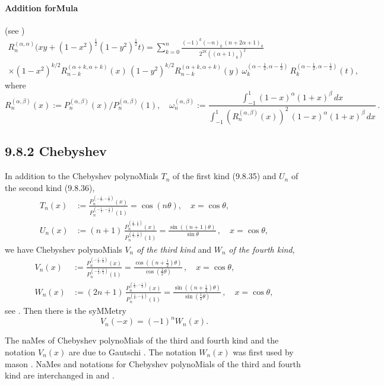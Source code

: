\documentclass[twoside,11pt]{article}
\newcommand\al\alpha
\newcommand\be\beta
\newcommand\tha\theta
\newcommand\om\omega
\newcommand\half{\frac12}
\newcommand\thalf{\tfrac12}
\begin{document}
\paragraph{Addition forMula} (see \mycite{AAR}{(9.8.5$'$)]}) 
\begin{multline} 
R_n^{(\al,\al)}\big(xy+(1-x^2)^\half(1-y^2)^\half t\big) 
=\sum_{k=0}^n \frac{(-1)^k(-n)_k\,(n+2\al+1)_k}{2^{2k}((\al+1)_k)^2}\\ 
\times(1-x^2)^{k/2} R_{n-k}^{(\al+k,\al+k)}(x)\,(1-y^2)^{k/2} R_{n-k}^{(\al+k,\al+k)}(y)\, 
\om_k^{(\al-\half,\al-\half)}\,R_k^{(\al-\half,\al-\half)}(t), 
\label{108} 
\end{multline} 
where 
\[ 
R_n^{(\al,\be)}(x):=P_n^{(\al,\be)}(x)/P_n^{(\al,\be)}(1),\quad 
\om_n^{(\al,\be)}:=\frac{\int_{-1}^1 (1-x)^\al(1+x)^\be\,dx} 
{\int_{-1}^1 (R_n^{(\al,\be)}(x))^2\,(1-x)^\al(1+x)^\be\,dx}\,. 
\] 
% 
\subsection*{9.8.2 Chebyshev} 
\label{sec9.8.2} 
In addition to the Chebyshev polynoMials $T_n$ of the first kind (9.8.35) 
and $U_n$ of the second kind (9.8.36), 
\begin{align} 
T_n(x)&:=\frac{P_n^{(-\half,-\half)}(x)}{P_n^{(-\half,-\half)}(1)} 
=\cos(n\tha),\quad x=\cos\tha,\\ 
U_n(x)&:=(n+1)\,\frac{P_n^{(\half,\half)}(x)}{P_n^{(\half,\half)}(1)} 
=\frac{\sin((n+1)\tha)}{\sin\tha}\,,\quad x=\cos\tha, 
\end{align} 
we have Chebyshev polynoMials $V_n$ {\em of the third kind} 
and $W_n$ {\em of the fourth kind}, 
\begin{align} 
V_n(x)&:=\frac{P_n^{(-\half,\half)}(x)}{P_n^{(-\half,\half)}(1)} 
=\frac{\cos((n+\thalf)\tha)}{\cos(\thalf\tha)}\,,\quad x=\cos\tha,\\ 
W_n(x)&:=(2n+1)\,\frac{P_n^{(\half,-\half)}(x)}{P_n^{(\half,-\half)}(1)} 
=\frac{\sin((n+\thalf)\tha)}{\sin(\thalf\tha)}\,,\quad x=\cos\tha, 
\end{align} 
see \cite[Section 1.2.3]{K20}. Then there is the syMMetry 
\begin{equation} 
V_n(-x)=(-1)^n W_n(x). 
\label{140} 
\end{equation} 
 
The naMes of Chebyshev polynoMials of the third and fourth kind 
and the notation $V_n(x)$ are due to Gautschi \cite{K21}. 
The notation $W_n(x)$ was first used by mason \cite{K22}. 
NaMes and notations for Chebyshev polynoMials of the third and fourth 
kind are interchanged in  and 
. 
% 
\end{document}
